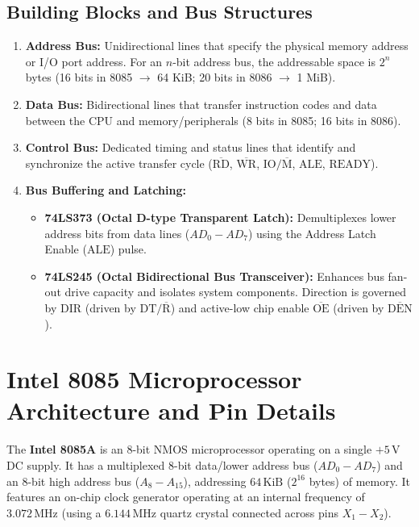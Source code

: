 \documentclass[12pt,a4paper]{article}
\begin{document}
\subsection{Building Blocks and Bus Structures}
\begin{enumerate}[leftmargin=*]
  \item \textbf{Address Bus:} Unidirectional lines that specify the physical memory address or I/O port address. For an $n$-bit address bus, the addressable space is $2^n$ bytes (16 bits in 8085 $\to$ 64 KiB; 20 bits in 8086 $\to$ 1 MiB).
  \item \textbf{Data Bus:} Bidirectional lines that transfer instruction codes and data between the CPU and memory/peripherals (8 bits in 8085; 16 bits in 8086).
  \item \textbf{Control Bus:} Dedicated timing and status lines that identify and synchronize the active transfer cycle ($\overline{\mathrm{RD}}$, $\overline{\mathrm{WR}}$, $\mathrm{IO}/\overline{\mathrm{M}}$, $\mathrm{ALE}$, $\mathrm{READY}$).
  \item \textbf{Bus Buffering and Latching:}
  \begin{itemize}[leftmargin=*]
    \item \textbf{74LS373 (Octal D-type Transparent Latch):} Demultiplexes lower address bits from data lines ($AD_0-AD_7$) using the Address Latch Enable ($\mathrm{ALE}$) pulse.
    \item \textbf{74LS245 (Octal Bidirectional Bus Transceiver):} Enhances bus fan-out drive capacity and isolates system components. Direction is governed by $\mathrm{DIR}$ (driven by $\mathrm{DT}/\overline{\mathrm{R}}$) and active-low chip enable $\overline{\mathrm{OE}}$ (driven by $\overline{\mathrm{DEN}}$).
  \end{itemize}
\end{enumerate}

\section{Intel 8085 Microprocessor Architecture and Pin Details}

\begin{tcolorbox}[defbox, title={Intel 8085 Architectural Overview}]
The \textbf{Intel 8085A} is an 8-bit NMOS microprocessor operating on a single $+5\,\mathrm{V}$ DC supply. It has a multiplexed 8-bit data/lower address bus ($AD_0-AD_7$) and an 8-bit high address bus ($A_8-A_{15}$), addressing $64\,\mathrm{KiB}$ ($2^{16}$ bytes) of memory. It features an on-chip clock generator operating at an internal frequency of $3.072\,\mathrm{MHz}$ (using a $6.144\,\mathrm{MHz}$ quartz crystal connected across pins $X_1-X_2$).
\end{tcolorbox}
\end{document}
